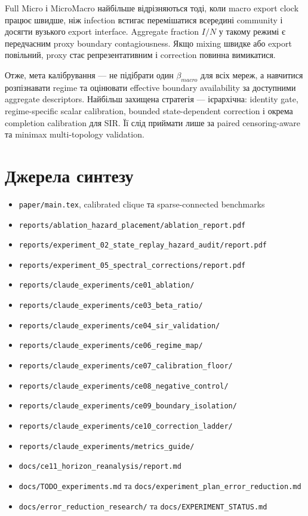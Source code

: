 \documentclass[11pt,a4paper]{article}
\begin{document}
Full Micro і MicroMacro найбільше відрізняються тоді, коли macro export clock
працює швидше, ніж infection встигає перемішатися всередині community і
досягти вузького export interface. Aggregate fraction $I/N$ у такому режимі
є передчасним proxy boundary contagiousness. Якщо mixing швидке або export
повільний, proxy стає репрезентативним і correction повинна вимикатися.

Отже, мета калібрування --- не підібрати один $\beta_{macro}$ для всіх мереж,
а навчитися розпізнавати regime та оцінювати effective boundary availability
за доступними aggregate descriptors. Найбільш захищена стратегія ---
ієрархічна: identity gate, regime-specific scalar calibration, bounded
state-dependent correction і окрема completion calibration для SIR. Її слід
приймати лише за paired censoring-aware та minimax multi-topology validation.

\appendix
\section{Джерела синтезу}

\begin{itemize}
 \item \texttt{paper/main.tex}, calibrated clique та sparse-connected benchmarks
 \item \texttt{reports/ablation\_hazard\_placement/ablation\_report.pdf}
 \item \texttt{reports/experiment\_02\_state\_replay\_hazard\_audit/report.pdf}
 \item \texttt{reports/experiment\_05\_spectral\_corrections/report.pdf}
 \item \texttt{reports/claude\_experiments/ce01\_ablation/}
 \item \texttt{reports/claude\_experiments/ce03\_beta\_ratio/}
 \item \texttt{reports/claude\_experiments/ce04\_sir\_validation/}
 \item \texttt{reports/claude\_experiments/ce06\_regime\_map/}
 \item \texttt{reports/claude\_experiments/ce07\_calibration\_floor/}
 \item \texttt{reports/claude\_experiments/ce08\_negative\_control/}
 \item \texttt{reports/claude\_experiments/ce09\_boundary\_isolation/}
 \item \texttt{reports/claude\_experiments/ce10\_correction\_ladder/}
 \item \texttt{reports/claude\_experiments/metrics\_guide/}
 \item \texttt{docs/ce11\_horizon\_reanalysis/report.md}
 \item \texttt{docs/TODO\_experiments.md} та
 \texttt{docs/experiment\_plan\_error\_reduction.md}
 \item \texttt{docs/error\_reduction\_research/} та
 \texttt{docs/EXPERIMENT\_STATUS.md}
\end{itemize}
\end{document}
